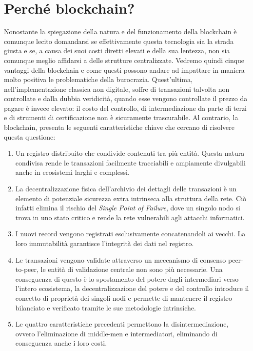 \section{Perché blockchain?}

Nonostante la spiegazione della natura e del funzionamento della blockchain è comunque
lecito domandarsi se effettivamente questa tecnologia sia la strada giusta e se, a
causa dei suoi costi diretti elevati e della sua lentezza, non sia comunque meglio
affidarsi a delle strutture centralizzate.
Vedremo quindi cinque vantaggi della blockchain e come questi possono andare ad impattare
in maniera molto positiva le problematiche della burocrazia.
Quest’ultima, nell’implementazione classica non digitale, soffre di transazioni talvolta
non controllate e dalla dubbia veridicità, quando esse vengono controllate il prezzo
da pagare è invece elevato: il costo del controllo, di intermediazione da parte di terzi
e di strumenti di certificazione non è sicuramente trascurabile.
Al contrario, la blockchain, presenta le seguenti caratteristiche chiave che cercano di
risolvere questa questione:
\begin{enumerate}
    \item Un registro distribuito che condivide contenuti tra più entità.
    Questa natura condivisa rende le transazioni facilmente tracciabili e
    ampiamente divulgabili anche in ecosistemi larghi e complessi.
    \item La decentralizzazione fisica dell'archivio dei dettagli delle transazioni
    è un elemento di potenziale sicurezza extra intrinseca alla struttura della rete.
    Ciò infatti elimina il rischio del \emph{Single Point of Failure}, dove un singolo
    nodo si trova in uno stato critico e rende la rete vulnerabili agli attacchi informatici.
    \item I nuovi record vengono registrati esclusivamente concatenandoli ai vecchi.
    La loro immutabilità garantisce l'integrità dei dati nel registro.
    \item Le transazioni vengono validate attraverso un meccanismo di consenso peer-to-peer,
    le entità di validazione centrale non sono più necessarie.
    Una conseguenza di questo è lo spostamento del potere dagli intermediari verso
    l'intero ecosistema, la decentralizzazione del potere e del controllo introduce
    il concetto di proprietà dei singoli nodi e permette di mantenere il registro
    bilanciato e verificato tramite le sue metodologie intrinsiche.
    \item Le quattro caratteristiche precedenti permettono la disintermediazione,
    ovvero l'eliminazione di middle-men e intermediatori, eliminando di conseguenza
    anche i loro costi.
\end{enumerate}

